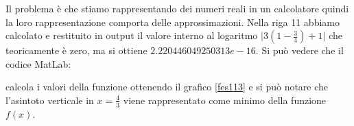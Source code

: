 Il problema è che stiamo rappresentando dei numeri reali in un calcolatore quindi la loro rappresentazione comporta delle approssimazioni. Nella riga 11 abbiamo calcolato e restituito in output il valore interno al logaritmo $\big|3(1-\frac{3}{4})+1\big|$ che teoricamente è zero, ma si ottiene $ 2.220446049250313e-16 $. 
Si può vedere che il codice MatLab:

calcola i valori della funzione ottenendo il grafico \ref{fes113} e si può notare che l'asintoto verticale in $x=\frac{4}{3}$ viene rappresentato come minimo della funzione $f(x)$.
